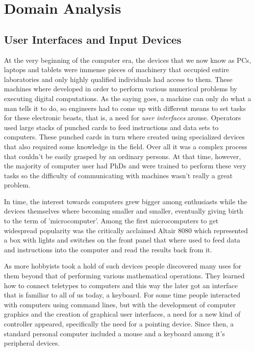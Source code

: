 \section{Domain Analysis}

\subsection{User Interfaces and Input Devices}


At the very beginning of the computer era, the devices that we now know as
PCs, laptops and tablets were immense pieces of machinery that occupied entire
laboratories and only highly qualified individuals had access to them. These
machines where developed in order to perform various numerical problems by
executing digital computations. As the saying goes, a machine can only do what
a man tells it to do, so engineers had to come up with different means to set
tasks for these electronic beasts, that is, a need for \emph{user interfaces}
arouse. Operators used large stacks of punched cards to feed instructions and
data sets to computers. These punched cards in turn where created using
specialized devices that also required some knowledge in the field. Over all
it was a complex process that couldn't be easily grasped by an ordinary
persons. At that time, however, the majority of computer user had PhDs and
were trained to perform these very tasks so the difficulty of communicating
with machines wasn't really a great problem.


In time, the interest towards computers grew bigger among enthusiasts while
the devices themselves where becoming smaller and smaller, eventually giving
birth to the term of 'microcomputer'. Among the first microcomputers to get
widespread popularity was the critically acclaimed Altair 8080 which
represented a box with lights and switches on the front panel that where used
to feed data and instructions into the computer and read the results back from
it.


As more hobbyists took a hold of such devices people discovered many uses for
them beyond that of performing various mathematical operations. They learned
how to connect teletypes to computers and this way the later got an interface
that is familiar to all of us today, a keyboard. For some time people
interacted with computers using command lines, but with the development of
computer graphics and the creation of graphical user interfaces, a need for a
new kind of controller appeared, specifically the need for a pointing device.
Since then, a standard personal computer included a mouse and a keyboard among
it's peripheral devices.

